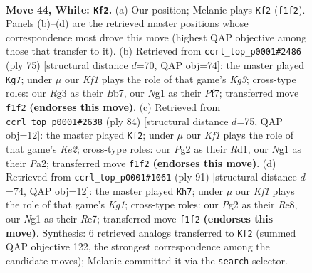 \documentclass[11pt]{article}
\begin{document}
\clearpage

\begin{figure}[p]\centering
\begin{subfigure}{0.46\textwidth}\centering
\resizebox{\linewidth}{!}{%
\newchessgame
\chessboard[
  setfen={6r1/3kn1br/4n1p1/7p/P3N2P/R5R1/6P1/5KN1 w - - 6 44},
  showmover=false,
  pgfstyle=straightmove, color=movearrow, markmove={f1-f2}
]}
\caption{}
\end{subfigure}\hfill
\begin{subfigure}{0.46\textwidth}\centering
\resizebox{\linewidth}{!}{%
\newchessgame
\chessboard[
  setfen={1r2r3/1bp2p2/6kn/P7/4P3/4N1N1/5PB1/2R3K1 b - - 6 38},
  showmover=false,
  pgfstyle=straightmove, color=movearrow, markmove={g6-g7}
]}
\caption{}
\end{subfigure}
\\[4pt]
\begin{subfigure}{0.46\textwidth}\centering
\resizebox{\linewidth}{!}{%
\newchessgame
\chessboard[
  setfen={3r1k2/1p3pp1/2n1r3/3N3p/P7/5PP1/P2RK2P/3R4 w - - 7 43},
  showmover=false,
  pgfstyle=straightmove, color=movearrow, markmove={e2-f2}
]}
\caption{}
\end{subfigure}\hfill
\begin{subfigure}{0.46\textwidth}\centering
\resizebox{\linewidth}{!}{%
\newchessgame
\chessboard[
  setfen={4r1k1/4rpp1/5n1p/R1R4P/8/4N1P1/5PK1/8 b - - 7 46},
  showmover=false,
  pgfstyle=straightmove, color=movearrow, markmove={g8-h7}
]}
\caption{}
\end{subfigure}
\caption{\textbf{Move 44, White: \texttt{Kf2}.} (a) Our position; Melanie plays \texttt{Kf2} (\texttt{f1f2}). Panels (b)--(d) are the retrieved master positions whose correspondence most drove this move (highest QAP objective among those that transfer to it). (b) Retrieved from \texttt{ccrl\_top\_p0001\#2486} (ply 75) [structural distance $d$=70, QAP obj=74]: the master played \texttt{Kg7}; under $\mu$ our \emph{Kf1} plays the role of that game's \emph{Kg3}; cross-type roles: our \emph{R}g3 as their \emph{B}b7, our \emph{N}g1 as their \emph{P}f7; transferred move \texttt{f1f2} \textbf{(endorses this move)}. (c) Retrieved from \texttt{ccrl\_top\_p0001\#2638} (ply 84) [structural distance $d$=75, QAP obj=12]: the master played \texttt{Kf2}; under $\mu$ our \emph{Kf1} plays the role of that game's \emph{Ke2}; cross-type roles: our \emph{P}g2 as their \emph{R}d1, our \emph{N}g1 as their \emph{P}a2; transferred move \texttt{f1f2} \textbf{(endorses this move)}. (d) Retrieved from \texttt{ccrl\_top\_p0001\#1061} (ply 91) [structural distance $d$=74, QAP obj=12]: the master played \texttt{Kh7}; under $\mu$ our \emph{Kf1} plays the role of that game's \emph{Kg1}; cross-type roles: our \emph{P}g2 as their \emph{R}e8, our \emph{N}g1 as their \emph{R}e7; transferred move \texttt{f1f2} \textbf{(endorses this move)}. Synthesis: 6 retrieved analogs transferred to \texttt{Kf2} (summed QAP objective 122, the strongest correspondence among the candidate moves); Melanie committed it via the \texttt{search} selector.}
\label{fig:thought-m86}
\end{figure}
\end{document}
